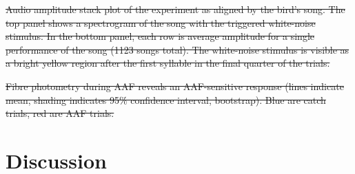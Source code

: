 \documentclass[10pt,letterpaper]{article}
\providecommand{\DIFdeltex}[1]{{\protect\color{red}\sout{#1}}}                      %
\providecommand{\DIFdelend}{} %
\providecommand{\DIFdelFL}[1]{\DIFdel{#1}} %
\providecommand{\DIFdel}[1]{\texorpdfstring{\DIFdeltex{#1}}{}} %
\begin{document}
{%
\DIFdelFL{Audio amplitude stack plot of the experiment as aligned by
    the bird's song.  The top panel shows a spectrogram of the song
    with the triggered white-noise stimulus.  In the bottom panel,
    each row is average amplitude for a single performance of the song
    (1123 songs total).  The white-noise stimulus is visible as a
    bright yellow region after the first syllable in the final quarter
    of the trials.}}

{%
\DIFdelFL{Fibre photometry during AAF reveals an AAF-sensitive response
  (lines indicate mean, shading indicates 95\% confidence interval, bootstrap).
  Blue are catch trials, red are AAF trials.}}

\DIFdelend \section{Discussion}
\label{sec:conclusion}
\end{document}
